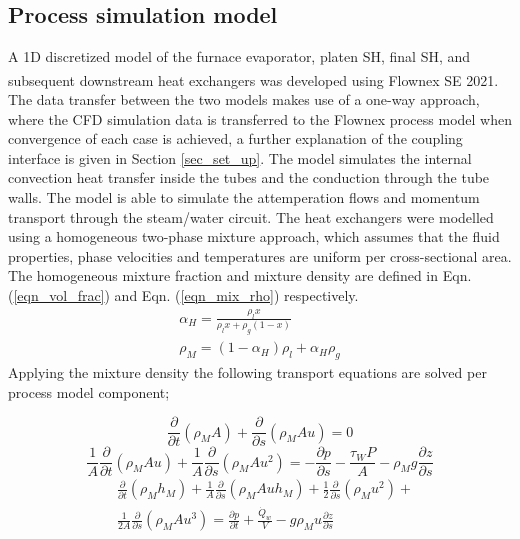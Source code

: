 \documentclass[twocolumn,10pt]{asme2ej}
\begin{document}
\subsection{Process simulation model}
A 1D discretized model of the furnace evaporator, platen SH, final SH, and subsequent downstream heat exchangers was developed using Flownex SE\textsuperscript{\textregistered} 2021. The data transfer between the two models makes use of a one-way approach, where the CFD simulation data is transferred to the Flownex process model when convergence of each case is achieved, a further explanation of the coupling interface is given in Section  \ref{sec_set_up}. The model simulates the internal convection heat transfer inside the tubes and the conduction through the tube walls. The model is able to simulate the attemperation flows and momentum transport through the steam/water circuit. The heat exchangers were modelled using a homogeneous two-phase mixture approach, which assumes that the fluid properties, phase velocities and temperatures are uniform per cross-sectional area. The homogeneous mixture fraction and mixture density are defined in Eqn. (\ref{eqn_vol_frac}) and Eqn. (\ref{eqn_mix_rho}) respectively.
\begin{gather}
\alpha_H = \frac{\rho_l x}{\rho_lx + \rho_g(1-x)} \label{eqn_vol_frac}\\  
\rho_M = (1-\alpha_H)\rho_l + \alpha_H\rho_g \label{eqn_mix_rho}
\end{gather}
Applying the mixture density the following transport equations are solved per process model component;

\begin{equation}\label{eqn_mix_conti}
\frac{\partial}{\partial t}(\rho_M A)+\frac{\partial}{\partial s}(\rho_MAu) = 0
\end{equation}
\begin{equation}\label{eqn_mix_mom}
\frac{1}{A} \frac{\partial}{\partial t}(\rho_M A u)+\frac{1}{A} \frac{\partial}{\partial s}(\rho_M A u^2) = -\frac{\partial p}{\partial s}-\frac{\tau_W P}{A}- \rho_M g \frac{\partial z}{\partial s}
\end{equation}
\begin{equation}\label{eqn_mix_energy}
\begin{split}
&\frac{\partial}{\partial t}(\rho_Mh_M)+\frac{1}{A}\frac{\partial}{\partial s}(\rho_MAuh_M)+\frac{1}{2}\frac{\partial}{\partial s}(\rho_Mu^2)+\\
&\frac{1}{2A}\frac{\partial}{\partial s}(\rho_MAu^3)=\frac{\partial p}{\partial t} + \frac{\dot{Q}_w}{V}-g\rho_Mu\frac{\partial z}{\partial s}
\end{split}
\end{equation}
\end{document}
